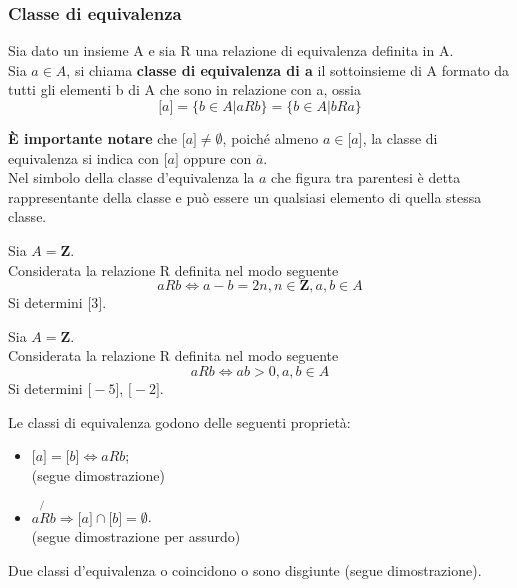 \begin{flushleft}
\subsubsection{Classe di equivalenza}
\begin{definizione}
Sia dato un insieme A e sia R una relazione di equivalenza definita in A.\\
Sia $a\in A$, si chiama \textbf{classe di equivalenza di a} il sottoinsieme di A formato da tutti gli elementi b di A che sono in relazione con a, ossia
\[\big[a\big] = \{b\in A|aRb\} = \{b\in A|bRa\}\]
\end{definizione}
\textbf{È importante notare} che $\big[a\big] \neq \emptyset$, poiché almeno $a\in \big[a\big]$, la classe di equivalenza si indica con $\big[a\big]$ oppure con $ \overline{a}$.\\
Nel simbolo della classe d'equivalenza la $a$ che figura tra parentesi è detta rappresentante della classe e può essere un qualsiasi elemento di quella stessa classe.\\
\begin{esercizio}
Sia $A = \mathbf{Z}$.\\
Considerata la relazione R definita nel modo seguente
\[aRb \Leftrightarrow a-b = 2n, n\in \mathbf{Z}, a,b \in A\]
Si determini $\big[3\big]$.
\end{esercizio}
\vspace{150px}

\begin{esercizio}
Sia $A = \mathbf{Z}$.\\
Considerata la relazione R definita nel modo seguente
\[aRb \Leftrightarrow ab> 0, a,b \in A\]
Si determini $\big[-5\big]$, $\big[-2\big]$.
\end{esercizio}
\vspace{150px}


Le classi di equivalenza godono delle seguenti proprietà:
\begin{itemize}
    \item $\big[a\big] = \big[b\big] \Leftrightarrow aRb$;\\
    (segue dimostrazione)
    \\ \vspace{300px}
    \item $a\not{R}b \Rightarrow \big[a\big]\cap \big[b\big] = \emptyset$.\\
    (segue dimostrazione per assurdo)
    \\ \vspace{300px}
\end{itemize}
\begin{proposizione}
Due classi d'equivalenza o coincidono o sono disgiunte (segue dimostrazione).
\end{proposizione}
\vspace{200px}


\end{flushleft}
